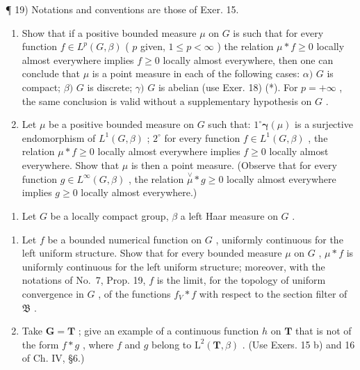 ¶ 19) Notations and conventions are those of Exer. 15.

\begin{enumerate}
\def\labelenumi{\alph{enumi})}
\item
  Show that if a positive bounded measure \(\mu\) on \(G\) is such that for every function \(f \in L^{p}(G, \beta)\) ( \(p\) given, \(1 \leqslant p < \infty\) ) the relation \(\mu * f \geqslant 0\) locally almost everywhere implies \(f \geqslant 0\) locally almost everywhere, then one can conclude that \(\mu\) is a point measure in each of the following cases: \(\alpha)\) \(G\) is compact; \(\beta)\) \(G\) is discrete; \(\gamma)\) \(G\) is abelian (use Exer. 18) (*). For \(p = +\infty\) , the same conclusion is valid without a supplementary hypothesis on \(G\) .
\item
  Let \(\mu\) be a positive bounded measure on \(G\) such that: \(1^{\circ} \pmb{\gamma}(\mu)\) is a surjective endomorphism of \(L^{1}(G, \beta)\) ; \(2^{\circ}\) for every function \(f \in L^{1}(G, \beta)\) , the relation \(\mu * f \geqslant 0\) locally almost everywhere implies \(f \geqslant 0\) locally almost everywhere. Show that \(\mu\) is then a point measure. (Observe that for every function \(g \in L^{\infty}(G, \beta)\) , the relation \(\stackrel{\vee}{\mu} * g \geqslant 0\) locally almost everywhere implies \(g \geqslant 0\) locally almost everywhere.)
\end{enumerate}

\begin{enumerate}
\def\labelenumi{\arabic{enumi})}
\setcounter{enumi}{19}
\tightlist
\item
  Let \(G\) be a locally compact group, \(\beta\) a left Haar measure on \(G\) .
\end{enumerate}

\begin{enumerate}
\def\labelenumi{\alph{enumi})}
\item
  Let \(f\) be a bounded numerical function on \(G\) , uniformly continuous for the left uniform structure. Show that for every bounded measure \(\mu\) on \(G\) , \(\mu * f\) is uniformly continuous for the left uniform structure; moreover, with the notations of No.~7, Prop. 19, \(f\) is the limit, for the topology of uniform convergence in \(G\) , of the functions \(f_V * f\) with respect to the section filter of \(\mathfrak{B}\) .
\item
  Take \(\mathbf{G} = \mathbf{T}\) ; give an example of a continuous function \(h\) on \(\mathbf{T}\) that is not of the form \(f*g\) , where \(f\) and \(g\) belong to \(\mathrm{L}^2 (\mathbf{T},\beta)\) . (Use Exers. 15 b) and 16 of Ch. IV, §6.)
\end{enumerate}

